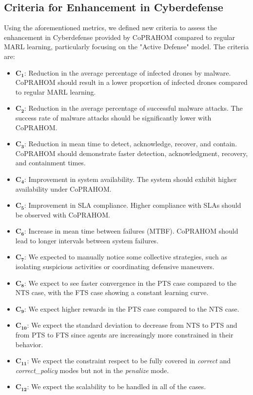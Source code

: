 \documentclass[conference]{IEEEtran}
\begin{document}
\subsection{Criteria for Enhancement in Cyberdefense}

Using the aforementioned metrics, we defined new criteria to assess the enhancement in Cyberdefense provided by CoPRAHOM compared to regular MARL learning, particularly focusing on the "Active Defense" model. The criteria are:

\begin{itemize}
    \item $\mathbf{C_1}$: Reduction in the average percentage of infected drones by malware. CoPRAHOM should result in a lower proportion of infected drones compared to regular MARL learning.
    \item $\mathbf{C_2}$: Reduction in the average percentage of successful malware attacks. The success rate of malware attacks should be significantly lower with CoPRAHOM.
    \item $\mathbf{C_3}$: Reduction in mean time to detect, acknowledge, recover, and contain. CoPRAHOM should demonstrate faster detection, acknowledgment, recovery, and containment times.
    \item $\mathbf{C_4}$: Improvement in system availability. The system should exhibit higher availability under CoPRAHOM.
    \item $\mathbf{C_5}$: Improvement in SLA compliance. Higher compliance with SLAs should be observed with CoPRAHOM.
    \item $\mathbf{C_6}$: Increase in mean time between failures (MTBF). CoPRAHOM should lead to longer intervals between system failures.
    \item $\mathbf{C_7}$: We expected to manually notice some collective strategies, such as isolating suspicious activities or coordinating defensive maneuvers.
    \item $\mathbf{C_8}$: We expect to see faster convergence in the PTS case compared to the NTS case, with the FTS case showing a constant learning curve.
    \item $\mathbf{C_9}$: We expect higher rewards in the PTS case compared to the NTS case.
    \item $\mathbf{C_{10}}$: We expect the standard deviation to decrease from NTS to PTS and from PTS to FTS since agents are increasingly more constrained in their behavior.
    \item $\mathbf{C_{11}}$: We expect the constraint respect to be fully covered in \textit{correct} and \textit{correct\_policy} modes but not in the \textit{penalize} mode.
    \item $\mathbf{C_{12}}$: We expect the scalability to be handled in all of the cases.
\end{itemize}
\end{document}

